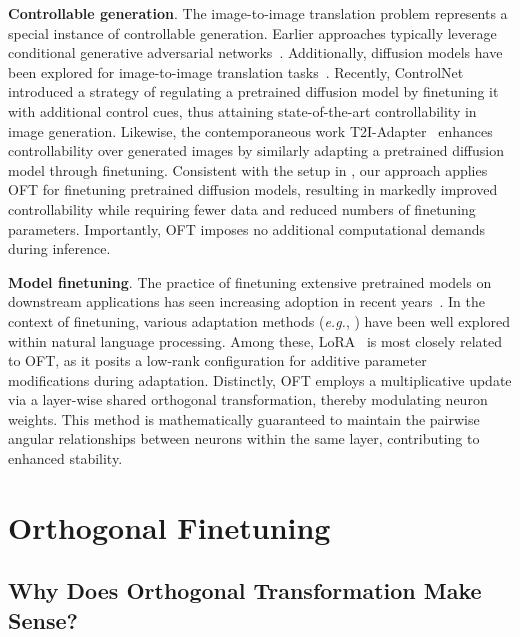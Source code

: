 \textbf{Controllable generation}. The image-to-image translation problem represents a special instance of controllable generation. Earlier approaches typically leverage conditional generative adversarial networks~\cite{isola2017image,zhu2017toward,wang2018high,park2019semantic,choi2018stargan}. Additionally, diffusion models have been explored for image-to-image translation tasks~\cite{saharia2022palette,voynov2022sketch,wang2022pretraining}. Recently, ControlNet~\cite{zhang2023adding} introduced a strategy of regulating a pretrained diffusion model by finetuning it with additional control cues, thus attaining state-of-the-art controllability in image generation. Likewise, the contemporaneous work T2I-Adapter~\cite{mou2023t2i} enhances controllability over generated images by similarly adapting a pretrained diffusion model through finetuning. Consistent with the setup in \cite{zhang2023adding,mou2023t2i}, our approach applies OFT for finetuning pretrained diffusion models, resulting in markedly improved controllability while requiring fewer data and reduced numbers of finetuning parameters. Importantly, OFT imposes no additional computational demands during inference.

\textbf{Model finetuning}. The practice of finetuning extensive pretrained models on downstream applications has seen increasing adoption in recent years~\cite{devlin2018bert,brown2020language,he2022masked}. In the context of finetuning, various adaptation methods (\emph{e.g.}, \cite{hulora2022,houlsby2019parameter,pfeiffer2020adapterfusion}) have been well explored within natural language processing. Among these, LoRA~\cite{hulora2022} is most closely related to OFT, as it posits a low-rank configuration for additive parameter modifications during adaptation. Distinctly, OFT employs a multiplicative update via a layer-wise shared orthogonal transformation, thereby modulating neuron weights. This method is mathematically guaranteed to maintain the pairwise angular relationships between neurons within the same layer, contributing to enhanced stability.

\section{Orthogonal Finetuning}

\subsection{Why Does Orthogonal Transformation Make Sense?}

